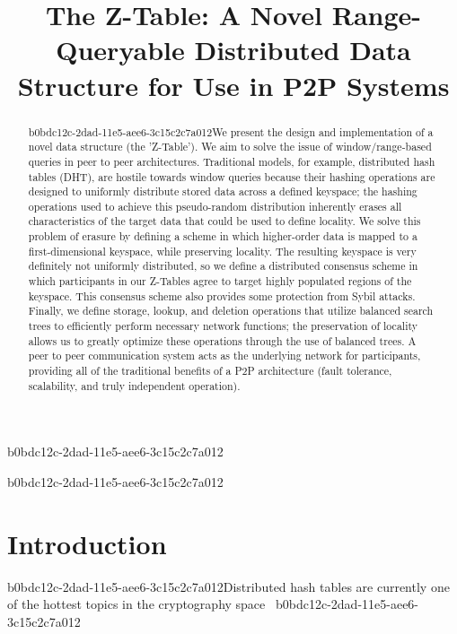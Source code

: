 \documentclass[12pt]{article}
\title{The Z-Table: A Novel Range-Queryable Distributed Data Structure for Use in P2P Systems}
\begin{document}
\maketitle

b0bdc12c-2dad-11e5-aee6-3c15c2c7a012\begin{abstract}
b0bdc12c-2dad-11e5-aee6-3c15c2c7a012We present the design and implementation of a novel data structure (the 'Z-Table'). We aim to solve the issue of window/range-based queries in peer to peer architectures. Traditional models, for example,  distributed hash tables (DHT), are hostile towards window queries because their hashing operations are designed to uniformly distribute stored data across a defined keyspace; the hashing operations used to achieve this pseudo-random distribution inherently erases all characteristics of the target data that could be used to define locality. We solve this problem of erasure by defining a scheme in which higher-order data is mapped to a first-dimensional keyspace, while preserving locality. The resulting keyspace is very definitely not uniformly distributed, so we define a distributed consensus scheme in which participants in our Z-Tables agree to target highly populated regions of the keyspace. This consensus scheme also provides some protection from Sybil attacks. Finally, we define storage, lookup, and deletion operations that utilize balanced search trees to efficiently perform necessary network functions; the preservation of locality allows us to greatly optimize these operations through the use of balanced trees. A peer to peer communication system acts as the underlying network for participants, providing all of the traditional benefits of a P2P architecture (fault tolerance, scalability, and truly independent operation).
\end{abstract}
b0bdc12c-2dad-11e5-aee6-3c15c2c7a012

\newpage
\section{Introduction}
b0bdc12c-2dad-11e5-aee6-3c15c2c7a012Distributed hash tables are currently one of the hottest topics in the cryptography space~\cite{Stoica:2001dj,Rowstron:2001ea,Ratnasamy:2001wn}
b0bdc12c-2dad-11e5-aee6-3c15c2c7a012
\printbibliography
\end{document}
